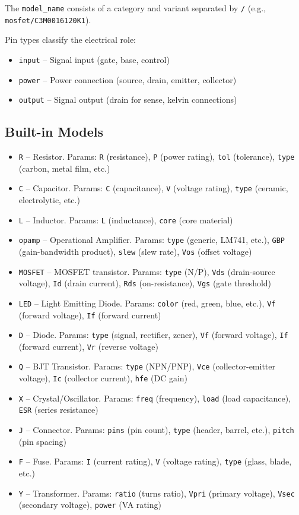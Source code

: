 The \texttt{model\_name} consists of a category and variant separated by \texttt{/} (e.g., \texttt{mosfet/C3M0016120K1}).

Pin types classify the electrical role:
\begin{itemize}
\item \texttt{input} -- Signal input (gate, base, control)
\item \texttt{power} -- Power connection (source, drain, emitter, collector)
\item \texttt{output} -- Signal output (drain for sense, kelvin connections)
\end{itemize}

\subsection{Built-in Models}
\begin{itemize}
\item \texttt{R} -- Resistor. Params: \texttt{R} (resistance), \texttt{P} (power rating), \texttt{tol} (tolerance), \texttt{type} (carbon, metal film, etc.)
\item \texttt{C} -- Capacitor. Params: \texttt{C} (capacitance), \texttt{V} (voltage rating), \texttt{type} (ceramic, electrolytic, etc.)
\item \texttt{L} -- Inductor. Params: \texttt{L} (inductance), \texttt{core} (core material)
\item \texttt{opamp} -- Operational Amplifier. Params: \texttt{type} (generic, LM741, etc.), \texttt{GBP} (gain-bandwidth product), \texttt{slew} (slew rate), \texttt{Vos} (offset voltage)
\item \texttt{MOSFET} -- MOSFET transistor. Params: \texttt{type} (N/P), \texttt{Vds} (drain-source voltage), \texttt{Id} (drain current), \texttt{Rds} (on-resistance), \texttt{Vgs} (gate threshold)
\item \texttt{LED} -- Light Emitting Diode. Params: \texttt{color} (red, green, blue, etc.), \texttt{Vf} (forward voltage), \texttt{If} (forward current)
\item \texttt{D} -- Diode. Params: \texttt{type} (signal, rectifier, zener), \texttt{Vf} (forward voltage), \texttt{If} (forward current), \texttt{Vr} (reverse voltage)
\item \texttt{Q} -- BJT Transistor. Params: \texttt{type} (NPN/PNP), \texttt{Vce} (collector-emitter voltage), \texttt{Ic} (collector current), \texttt{hfe} (DC gain)
\item \texttt{X} -- Crystal/Oscillator. Params: \texttt{freq} (frequency), \texttt{load} (load capacitance), \texttt{ESR} (series resistance)
\item \texttt{J} -- Connector. Params: \texttt{pins} (pin count), \texttt{type} (header, barrel, etc.), \texttt{pitch} (pin spacing)
\item \texttt{F} -- Fuse. Params: \texttt{I} (current rating), \texttt{V} (voltage rating), \texttt{type} (glass, blade, etc.)
\item \texttt{Y} -- Transformer. Params: \texttt{ratio} (turns ratio), \texttt{Vpri} (primary voltage), \texttt{Vsec} (secondary voltage), \texttt{power} (VA rating)
\end{itemize}

